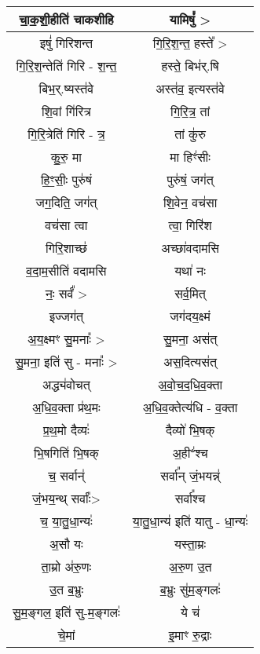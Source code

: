 {\begin{longtable}{|c|c|}
\hline
चा॒क॒शी॒हीति॑ चाकशीहि        & यामिषुं᳚ >\\
\hline
इषुं॑ गिरिशन्त               & गि॒रि॒श॒न्त॒ हस्ते᳚ >\\
\hline
गि॒रि॒श॒न्तेति॑ गिरि - श॒न्त॒     & हस्ते॒ बिभ॑र्.षि\\
\hline
बिभ॒र्.ष्यस्त॑वे               & अस्त॑व॒ इत्यस्त॑वे\\
\hline
शि॒वां गि॑रित्र              & गि॒रि॒त्र॒ तां\\
\hline
गि॒रि॒त्रेति॑ गिरि - त्र॒       & तां कु॑रु\\
\hline
कु॒रु॒ मा                    & मा हिꣳ॑सीः\\
\hline
हि॒ꣳ॒सीः॒ पुरु॑षं               & पुरु॑षं॒ जग॑त्\\
\hline
जग॒दिति॒ जग॑त्               & शि॒वेन॒ वच॑सा\\
\hline
वच॑सा त्वा                 & त्वा॒ गिरि॑श\\
\hline
गिरि॒शाच्छ॑                 & अच्छा॑वदामसि\\
\hline
व॒दा॒म॒सीति॑ वदामसि          & यथा॑ नः\\
\hline
नः॒ सर्वं᳚ >                 & सर्व॒मित्\\
\hline
इज्जग॑त्                    & जग॑दय॒क्ष्मं\\
\hline
अ॒य॒क्ष्मꣳ सु॒मनाः᳚ >           & सु॒मना॒ अस॑त्\\
\hline
सु॒मना॒ इति॑ सु - मनाः᳚ >      & अस॒दित्यस॑त्\\
\hline
अद्ध्य॑वोचत्                 & अ॒वो॒च॒द॒धि॒व॒क्ता\\
\hline
अ॒धि॒व॒क्ता प्र॑थ॒मः            & अ॒धि॒व॒क्तेत्य॑धि - व॒क्ता\\
\hline
प्र॒थ॒मो दैव्यः॑               & दैव्यो॑ भि॒षक्\\
\hline
भि॒षगिति॑ भि॒षक्             & अ॒हीꣲ॑श्च\\
\hline
च॒ सर्वान्॑                  & सर्वा᳚न् जं॒भयन्न्॑\\
\hline
जं॒भय॒न्थ् सर्वाः᳚>             & सर्वा᳚श्च\\
\hline
च॒ या॒तु॒धा॒न्यः॑               & या॒तु॒धा॒न्य॑ इति॑ यातु - धा॒न्यः॑\\
\hline
अ॒सौ यः                   & यस्ता॒म्रः\\
\hline
ता॒म्रो अ॑रु॒णः               & अ॒रु॒ण उ॒त\\
\hline
उ॒त ब॒भ्रुः                  & ब॒भ्रुः सु॑म॒ङ्गलः॑\\
\hline
सु॒म॒ङ्गल॒ इति॑ सु-म॒ङ्गलः॑        & ये च॑\\
\hline
चे॒मां                      & इ॒माꣳ रु॒द्राः\\

\end{longtable}}
